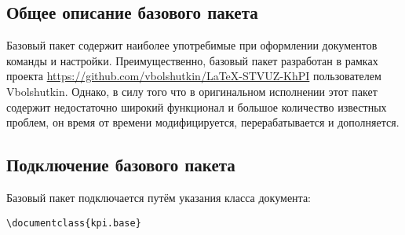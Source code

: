 \subsection{Общее описание базового пакета}
Базовый пакет содержит наиболее употребимые при оформлении документов команды и настройки. Преимущественно, базовый пакет разработан в рамках проекта \url{https://github.com/vbolshutkin/LaTeX-STVUZ-KhPI} пользователем Vbolshutkin. Однако, в силу того что в оригинальном исполнении этот пакет содержит недостаточно широкий функционал и большое количество известных проблем, он время от времени модифицируется, перерабатывается и дополняется.
\subsection{Подключение базового пакета}
Базовый пакет подключается путём указания класса документа:
{\small
\begin{Verbatim}
\documentclass{kpi.base}
\end{Verbatim}}
\normalsize